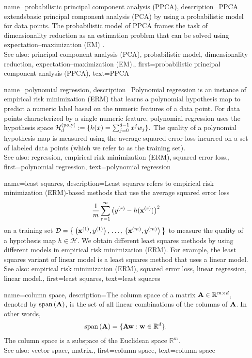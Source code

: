 {
{name={probabilistic principal component analysis (PPCA)}, 
	description={PPCA 
		extends\linebreak basic principal component analysis (PCA) by using a probabilistic model for data points. 
		The probabilistic model of PPCA frames the task of dimensionality reduction 
		as an estimation problem that can be solved using expectation–maximization (EM) \cite{TippingProbPCA}.
				\\
		See also: principal component analysis (PCA), probabilistic model, dimensionality reduction, expectation–maximization (EM).},
	first={probabilistic principal component analysis (PPCA)},
	text={PPCA}
}
	
{name={polynomial regression}, 
	description={Polynomial 
		regression is an instance of empirical risk minimization (ERM) that learns a polynomial hypothesis 
		map to predict a numeric label based on the numeric features of a data point. 
		 For data points characterized by a single numeric feature, polynomial regression uses the hypothesis space 
		$\mathcal{H}^{(\rm poly)}_{d} := \{ h(x) = \sum_{j=0}^{d-1} x^{j} w_{j} \}.$
		The quality of a polynomial hypothesis map is measured using the average squared error loss 
		incurred on a set of labeled data points (which we refer to as the training set).
					\\
		See also: regression, empirical risk minimization (ERM), squared error loss.},
	first={polynomial regression},
	text={polynomial regression}
}

{name={least squares},
 description={Least squares refers to empirical risk minimization (ERM)-based 
               methods that use the average squared error loss 
			   $$ \frac{1}{m} \sum_{r=1}^{m} \big( y^{(r)} 
			   - h({\bf x}^{(r)}) \big)^{2} $$   
			   on a training set $\mathcal{D} = \big\{ \left( {\bf x}^{(1)},y^{(1)} \right), \,\ldots, \,
			   \left( {\bf x}^{(m)},y^{(m)} \right) \big\}$	
			   to measure the quality of a hypothesis map $h \in \mathcal{H}$. 
			   We obtain different least squares methods by using different models 
			   in empirical risk minimization (ERM). For example, the least squares variant of linear model 
			   is a least squares method that uses a linear model.
			   \\
		See also: empirical risk minimization (ERM), squared error loss, linear regression, linear model.},
	first={least squares},
	text={least squares}
}

{name={column space},
 description={The column space of a matrix 
                 ${\bf A} \in \mathbb{R}^{m \times d}$,
			   denoted by ${\rm span}\left({\bf A} \right)$, is the set of all linear combinations of the 
			   columns of ${\bf A}$. In other words, 
			   $$ {\rm span}\left({\bf A} \right) = \{ {\bf A} {\bf w} : {\bf w} \in \mathbb{R}^{d} \}. $$
			   The column space is a subspace of the Euclidean space $\mathbb{R}^{m}$.
			   \\
		See also: vector space, matrix.},
	first={column space},
	text={column space}
}

}
